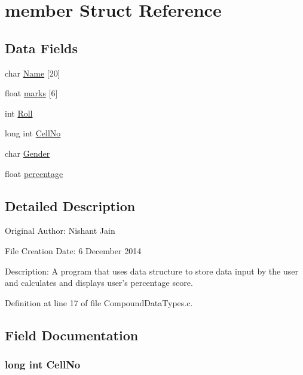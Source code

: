 \hypertarget{structmember}{\section{member Struct Reference}
\label{structmember}
}
\subsection*{Data Fields}
\begin{DoxyCompactItemize}
\item 
char \hyperlink{structmember_a2053e4d21d9f2f5158910a2977224749}{Name} \mbox{[}20\mbox{]}
\item 
float \hyperlink{structmember_ad4c3e5c25307fd49af034db07064803a}{marks} \mbox{[}6\mbox{]}
\item 
int \hyperlink{structmember_abf08303c7c1c86949317530985b66f65}{Roll}
\item 
long int \hyperlink{structmember_ab06b37fd487ea9df9d12601461704dc2}{Cell\+No}
\item 
char \hyperlink{structmember_afbcfc79081bb5d32e3e787e11b880fda}{Gender}
\item 
float \hyperlink{structmember_a34c5b668208550b3c34a2ed0eec615f5}{percentage}
\end{DoxyCompactItemize}


\subsection{Detailed Description}




Original Author\+: Nishant Jain

File Creation Date\+: 6 December 2014

Description\+: A program that uses data structure to store data input by the user and calculates and displays user's percentage score. 

Definition at line 17 of file Compound\+Data\+Types.\+c.



\subsection{Field Documentation}
\hypertarget{structmember_ab06b37fd487ea9df9d12601461704dc2}{
\subsubsection[{Cell\+No}]{\setlength{\rightskip}{0pt plus 5cm}long int Cell\+No}}\label{structmember_ab06b37fd487ea9df9d12601461704dc2}


